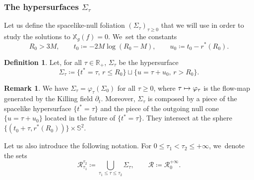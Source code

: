 \documentclass[10pt]{amsart}
\newcommand\mto{\mathchoice{\longmapsto}{\mapsto}{\mapsto}{\mapsto}}
\theoremstyle{plain}
\theoremstyle{definition}
\newtheorem{definition}[proposition]{Definition}
\newtheorem{remark}[proposition]{Remark}
\newcommand\R{{\mathbb{R}}}
\newcommand\T{{\mathbb{X}}}
\begin{document}
\subsubsection{The hypersurfaces $\Sigma_\tau$}\label{Subsubsecvolume}

Let us define the spacelike-null foliation $(\Sigma_\tau)_{\tau \geq 0}$ that we will use in order to study the solutions to $\T_g (f)=0$. We~set the constants
\[
R_0>3M, \qquad t_0 \coloneqq -2M \log (R_0-M), \qquad u_0\coloneqq t_0-r^*(R_0).
\]

\begin{definition}
Let, for all $\tau\in \R_+$, $\Sigma_\tau$ be the hypersurface
\[
\Sigma_\tau \coloneqq \{ t^* = \tau, \, r \leq R_0 \} \sqcup \{ u=\tau+u_0, \, r > R_0 \}.
\]
\end{definition}
\begin{remark}
We have $\Sigma_\tau=\varphi_{\tau}(\Sigma_0)$ for all $\tau\geq 0$, where $\tau \mto \varphi_\tau$ is the flow-map generated by the Killing field $\partial_t$. Moreover, $\Sigma_\tau$ is composed by a piece of the spacelike hypersurface $\{ t^* = \tau \}$ and the piece of the outgoing null cone $\{u = \tau +u_0 \}$ located in the future of $\{t^* = \tau \}$. They intersect at the sphere $\{(t_0+\tau,r^*(R_0))\}\times \mathbb{S}^2$.
\end{remark}

Let us also introduce the following notation. For $0\leq \tau_1<\tau_2\leq +\infty$, we~denote the sets
\[
\mathcal{R}^{\tau_2}_{\tau_1} \coloneqq \bigcup_{\tau_1\leq\tau\leq \tau_2} \Sigma_\tau,\qquad \mathcal{R} \coloneqq \mathcal{R}^{+\infty}_0.
\]
\end{document}
